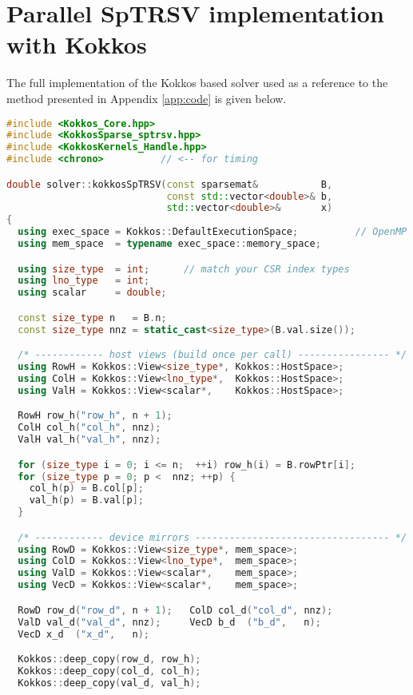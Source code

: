 \chapter{Parallel SpTRSV implementation with Kokkos}
\label{app:code_kokkos}
The full implementation of the Kokkos based solver used as a reference to the method presented in Appendix \ref{app:code} is given below.
\begin{lstlisting}[language=C++,caption={Full implementation of the
\texttt{kokkosSpTRSV} kernel.}]
    #include <Kokkos_Core.hpp>
#include <KokkosSparse_sptrsv.hpp>
#include <KokkosKernels_Handle.hpp>
#include <chrono>          // <-- for timing

double solver::kokkosSpTRSV(const sparsemat&           B,
                            const std::vector<double>& b,
                            std::vector<double>&       x)
{
  using exec_space = Kokkos::DefaultExecutionSpace;          // OpenMP here
  using mem_space  = typename exec_space::memory_space;

  using size_type  = int;      // match your CSR index types
  using lno_type   = int;
  using scalar     = double;

  const size_type n   = B.n;
  const size_type nnz = static_cast<size_type>(B.val.size());

  /* ------------ host views (build once per call) ---------------- */
  using RowH = Kokkos::View<size_type*, Kokkos::HostSpace>;
  using ColH = Kokkos::View<lno_type*,  Kokkos::HostSpace>;
  using ValH = Kokkos::View<scalar*,    Kokkos::HostSpace>;

  RowH row_h("row_h", n + 1);
  ColH col_h("col_h", nnz);
  ValH val_h("val_h", nnz);

  for (size_type i = 0; i <= n;  ++i) row_h(i) = B.rowPtr[i];
  for (size_type p = 0; p <  nnz; ++p) {
    col_h(p) = B.col[p];
    val_h(p) = B.val[p];
  }

  /* ------------ device mirrors ---------------------------------- */
  using RowD = Kokkos::View<size_type*, mem_space>;
  using ColD = Kokkos::View<lno_type*,  mem_space>;
  using ValD = Kokkos::View<scalar*,    mem_space>;
  using VecD = Kokkos::View<scalar*,    mem_space>;

  RowD row_d("row_d", n + 1);   ColD col_d("col_d", nnz);
  ValD val_d("val_d", nnz);     VecD b_d  ("b_d",   n);
  VecD x_d  ("x_d",   n);

  Kokkos::deep_copy(row_d, row_h);
  Kokkos::deep_copy(col_d, col_h);
  Kokkos::deep_copy(val_d, val_h);


\end{lstlisting}
